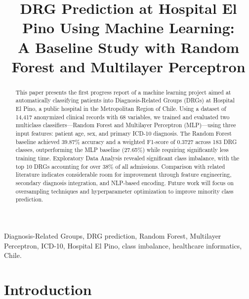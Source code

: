 \documentclass{IEEEtran}
\begin{document}
\title{DRG Prediction at Hospital El Pino Using Machine Learning:\\
A Baseline Study with Random Forest and Multilayer Perceptron}

\author{
}

\maketitle

\begin{abstract}
This paper presents the first progress report of a machine learning project aimed at automatically classifying patients into Diagnosis-Related Groups (DRGs) at Hospital El Pino, a public hospital in the Metropolitan Region of Chile. Using a dataset of 14,417 anonymized clinical records with 68 variables, we trained and evaluated two multiclass classifiers---Random Forest and Multilayer Perceptron (MLP)---using three input features: patient age, sex, and primary ICD-10 diagnosis. The Random Forest baseline achieved 39.87\% accuracy and a weighted F1-score of 0.3727 across 183 DRG classes, outperforming the MLP baseline (27.65\%) while requiring significantly less training time. Exploratory Data Analysis revealed significant class imbalance, with the top 10 DRGs accounting for over 38\% of all admissions. Comparison with related literature indicates considerable room for improvement through feature engineering, secondary diagnosis integration, and NLP-based encoding. Future work will focus on oversampling techniques and hyperparameter optimization to improve minority class prediction.
\end{abstract}

\begin{IEEEkeywords}
Diagnosis-Related Groups, DRG prediction, Random Forest, Multilayer Perceptron, ICD-10, Hospital El Pino, class imbalance, healthcare informatics, Chile.
\end{IEEEkeywords}

\section{Introduction}
\end{document}
